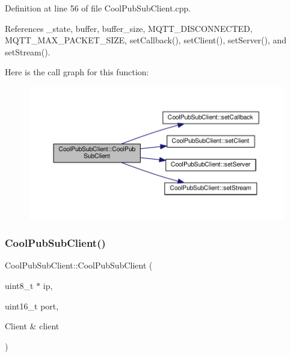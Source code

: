 Definition at line 56 of file Cool\+Pub\+Sub\+Client.\+cpp.



References \+\_\+state, buffer, buffer\+\_\+size, M\+Q\+T\+T\+\_\+\+D\+I\+S\+C\+O\+N\+N\+E\+C\+T\+ED, M\+Q\+T\+T\+\_\+\+M\+A\+X\+\_\+\+P\+A\+C\+K\+E\+T\+\_\+\+S\+I\+ZE, set\+Callback(), set\+Client(), set\+Server(), and set\+Stream().

Here is the call graph for this function\+:\nopagebreak
\begin{figure}[H]
\begin{center}
\leavevmode
\includegraphics[width=350pt]{d8/d4b/class_cool_pub_sub_client_a0797679d710bf2b1aa802107bdb1a2fe_cgraph}
\end{center}
\end{figure}
\mbox{\label{class_cool_pub_sub_client_a15e4dd41ebda943c377539086f70469d}} 
\subsubsection{\texorpdfstring{Cool\+Pub\+Sub\+Client()}{CoolPubSubClient()}\hspace{0.1cm}{\footnotesize\ttfamily [7/14]}}
{\footnotesize\ttfamily Cool\+Pub\+Sub\+Client\+::\+Cool\+Pub\+Sub\+Client (\begin{DoxyParamCaption}\item[{uint8\+\_\+t $\ast$}]{ip,  }\item[{uint16\+\_\+t}]{port,  }\item[{Client \&}]{client }\end{DoxyParamCaption})}



